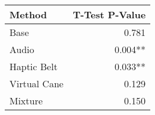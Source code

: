 
\centering
\begin{tabular}{lr}
\toprule
      Method & T-Test P-Value \\
\midrule
        Base &          0.781 \\
       Audio &        0.004** \\
 Haptic Belt &        0.033** \\
Virtual Cane &          0.129 \\
     Mixture &          0.150 \\
\bottomrule
\end{tabular}
